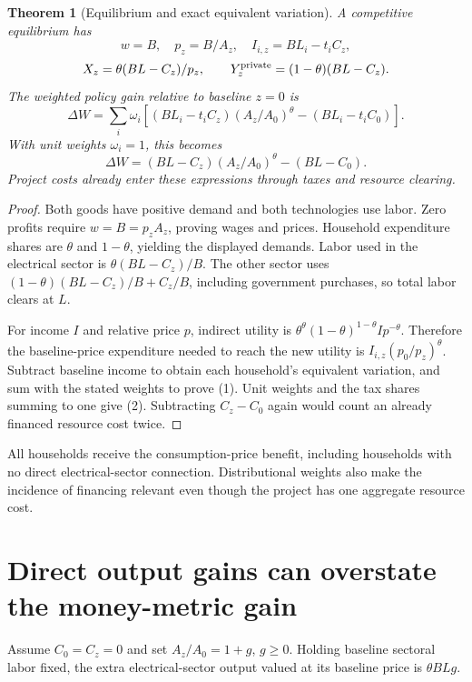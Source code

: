 \documentclass[11pt,a4paper]{article}
\newtheorem{theorem}{Theorem}[section]
\theoremstyle{definition}
\theoremstyle{remark}
\begin{document}
\begin{theorem}[Equilibrium and exact equivalent variation]
A competitive equilibrium has
\[
 w=B,\quad p_z=B/A_z,\quad I_{i,z}=BL_i-t_iC_z,
\]
\[
 X_z=\theta(BL-C_z)/p_z,\qquad
 Y_z^{\rm private}=(1-\theta)(BL-C_z).
\]
The weighted policy gain relative to baseline $z=0$ is
\[
 \Delta W=\sum_i\omega_i\left[
 (BL_i-t_iC_z)(A_z/A_0)^\theta-(BL_i-t_iC_0)\right].\tag{1}
\]
With unit weights $\omega_i=1$, this becomes
\[
 \Delta W=(BL-C_z)(A_z/A_0)^\theta-(BL-C_0).\tag{2}
\]
Project costs already enter these expressions through taxes and resource clearing.
\end{theorem}
\begin{proof}
Both goods have positive demand and both technologies use labor. Zero profits require $w=B=p_zA_z$, proving wages and prices. Household expenditure shares are $\theta$ and $1-\theta$, yielding the displayed demands. Labor used in the electrical sector is $\theta(BL-C_z)/B$. The other sector uses $(1-\theta)(BL-C_z)/B+C_z/B$, including government purchases, so total labor clears at $L$.

For income $I$ and relative price $p$, indirect utility is
$\theta^\theta(1-\theta)^{1-\theta}I p^{-\theta}$. Therefore the baseline-price expenditure needed to reach the new utility is $I_{i,z}(p_0/p_z)^\theta$. Subtract baseline income to obtain each household's equivalent variation, and sum with the stated weights to prove (1). Unit weights and the tax shares summing to one give (2). Subtracting $C_z-C_0$ again would count an already financed resource cost twice.
\end{proof}

All households receive the consumption-price benefit, including households with no direct electrical-sector connection. Distributional weights also make the incidence of financing relevant even though the project has one aggregate resource cost.

\section{Direct output gains can overstate the money-metric gain}
Assume $C_0=C_z=0$ and set $A_z/A_0=1+g$, $g\geq0$. Holding baseline sectoral labor fixed, the extra electrical-sector output valued at its baseline price is $\theta BLg$.
\end{document}
